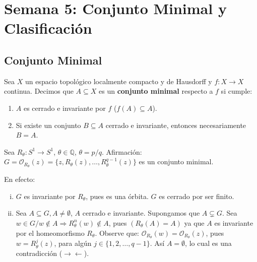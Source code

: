 
\chapter{Semana 5: Conjunto Minimal y Clasificación}

\section{Conjunto Minimal}

\begin{definicion}
	Sea $X$ un espacio topológico localmente compacto y de Hausdorff y $f: X \to X$ continua. Decimos que $A \subseteq X$ es un \textbf{conjunto minimal} respecto a $f$ si cumple:
	\begin{enumerate}[1)]
		\item $A$ es cerrado e invariante por $f$ ($f(A) \subseteq A$).
		\item Si existe un conjunto $B \subseteq A$ cerrado e invariante, entonces necesariamente $B = A$.
	\end{enumerate}
\end{definicion}

\begin{ejemplo}
	Sea $R_\theta: S^1 \to S^1$, $\theta \in \mathbb{Q}$, $\theta = p/q$.
	Afirmación: $G = \mathcal{O}_{R_\theta}(z) = \{z, R_\theta(z), \dots, R_\theta^{q-1}(z)\}$ es un conjunto minimal.
	
	En efecto:
	\begin{enumerate}[i)]
		\item $G$ es invariante por $R_\theta$, pues es una órbita. $G$ es cerrado por ser finito.
		\item Sea $A \subseteq G, A \neq \emptyset$, $A$ cerrado e invariante. Supongamos que $A \subsetneq G$.
		Sea $w \in G / w \notin A \Rightarrow R_\theta^n(w) \notin A$, pues $(R_\theta(A) = A)$ ya que $A$ es invariante por el homeomorfismo $R_\theta$.
		Observe que: $\mathcal{O}_{R_\theta}(w) = \mathcal{O}_{R_\theta}(z)$, pues $w = R_\theta^j(z)$, para algún $j \in \{1, 2, \dots, q-1\}$. Así $A = \emptyset$, lo cual es una contradicción ($\rightarrow \leftarrow$).
	\end{enumerate}
\end{ejemplo}


